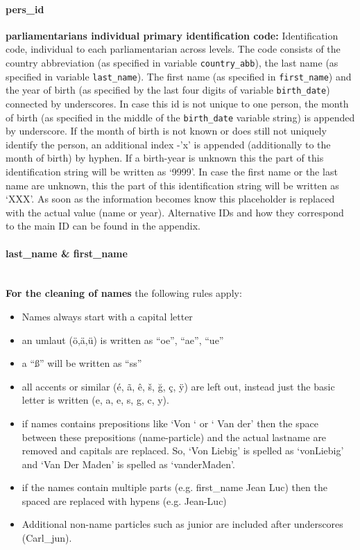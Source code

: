 \documentclass{article}
\begin{document}
\paragraph{pers\_id}
    \textbf{parliamentarians individual primary identification code:} Identification code, individual to each parliamentarian across levels. The code consists of the country abbreviation (as specified in variable  \texttt{country\_abb}), the last name (as specified in variable \texttt{last\_name}). The first name (as specified in \texttt{first\_name}) and the year of birth (as specified by the last four digits of variable \texttt{birth\_date}) connected by underscores. In case this id is not unique to one person, the month of birth (as specified in the middle of the \texttt{birth\_date} variable string) is appended by underscore. If the month of birth is not known or does still not uniquely identify the person, an additional index -'x' is appended (additionally to the month of birth) by hyphen. If a birth-year is unknown this the part of this identification string will be written as `9999'. In case the first name or the last name are unknown, this the part of this identification string will be written as `XXX'. As soon as the information becomes know this placeholder is replaced with the actual value (name or year). Alternative IDs and how they correspond to the main ID can be found in the appendix.

\paragraph{last\_name \& first\_name}\\
     \textbf{For the cleaning of names} the following rules apply: 

     \begin{itemize}
    \item Names always start with a capital letter
    \item an umlaut (ö,ä,ü) is written as ``oe”, ``ae”, ``ue”
    \item a ``ß” will be written as ``ss”
    \item all accents or similar (é, ã, ê, š, ğ, ç, ÿ) are left out, instead just the basic letter is written (e, a, e, s, g, c, y).
    \item if names contains prepositions like  `Von ` or ` Van der' then the space between these prepositions (name-particle) and the actual lastname are removed and capitals are replaced. So, `Von Liebig' is spelled as `vonLiebig' and `Van Der Maden' is spelled as `vanderMaden'.
    \item if the names contain multiple parts (e.g. first\_name Jean Luc) then the spaced are replaced with hypens (e.g. Jean-Luc)
    \item Additional non-name particles such as junior are included after underscores (Carl\_jun).
    \end{itemize}
\end{document}

